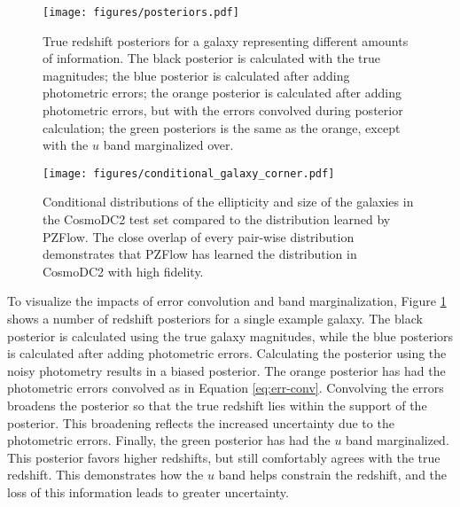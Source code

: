 \documentclass[twocolumn,twocolappendix]{aastex631}
\begin{document}
\begin{figure}[t]
    \begin{centering}
        \texttt{[image: figures/posteriors.pdf]}
        \caption{
            True redshift posteriors for a galaxy representing different amounts of information.
            The black posterior is calculated with the true magnitudes;
            the blue posterior is calculated after adding photometric errors;
            the orange posterior is calculated after adding photometric errors, but with the errors convolved during posterior calculation;
            the green posteriors is the same as the orange, except with the $u$ band marginalized over.
        }
        \label{fig:posteriors}
    \end{centering}
\end{figure}

\begin{figure*}[t]
    \begin{centering}
        \texttt{[image: figures/conditional\_galaxy\_corner.pdf]}
        \caption{
            Conditional distributions of the ellipticity and size of the galaxies in the CosmoDC2 test set compared to the distribution learned by PZFlow.
            The close overlap of every pair-wise distribution demonstrates that PZFlow has learned the distribution in CosmoDC2 with high fidelity.
        }
        \label{fig:conditional-corner}
    \end{centering}
\end{figure*}

To visualize the impacts of error convolution and band marginalization, Figure \ref{fig:posteriors} shows a number of redshift posteriors for a single example galaxy.
The black posterior is calculated using the true galaxy magnitudes, while the blue posteriors is calculated after adding photometric errors.
Calculating the posterior using the noisy photometry results in a biased posterior.
The orange posterior has had the photometric errors convolved as in Equation \ref{eq:err-conv}.
Convolving the errors broadens the posterior so that the true redshift lies within the support of the posterior.
This broadening reflects the increased uncertainty due to the photometric errors.
Finally, the green posterior has had the $u$ band marginalized.
This posterior favors higher redshifts, but still comfortably agrees with the true redshift.
This demonstrates how the $u$ band helps constrain the redshift, and the loss of this information leads to greater uncertainty.
\end{document}
